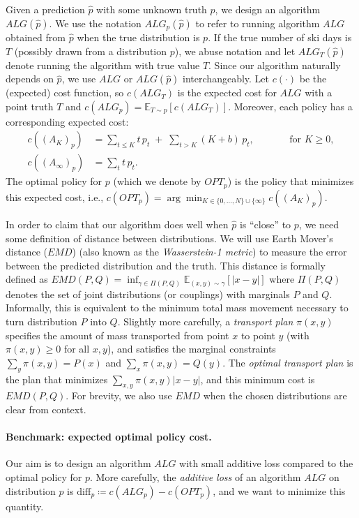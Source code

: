 Given a prediction $\hat{p}$ with some unknown truth $p$, we design an algorithm $ALG(\hat{p})$. We use the notation $ALG_p(\hat{p})$ to refer to running algorithm $ALG$ obtained from $\hat{p}$ when the true distribution is $p$. If the true number of ski days is $T$ (possibly drawn from a distribution $p$), we abuse notation and let $ALG_T(\hat p)$ denote running the algorithm with true value $T$.  Since our algorithm naturally depends on $\hat{p}$, we use $ALG$ or $ALG(\hat{p})$ interchangeably. Let $c(\cdot)$ be the (expected) cost function, so $c(ALG_T)$ is the expected cost for $ALG$ with a point truth $T$ and $c(ALG_p) = \mathbb{E}_{T \sim p}[c(ALG_T)]$. Moreover, each policy has a corresponding expected cost:
\begin{equation*} \label{eq:cost} 
\begin{aligned}
c((A_K)_p)
&= \sum_{t \le K} t\,p_t \;+\; \sum_{t > K} (K+b)\,p_t,
\qquad &&\text{for } K \ge 0, \\
c((A_\infty)_p)
&= \sum_{t} t\,p_t.
\end{aligned}
\end{equation*}
The optimal policy for $p$ (which we denote by $OPT_p$) is the policy that minimizes this expected cost, i.e., $c(OPT_p) = \arg \min_{K \in \{0, \dots, N\} \cup \{\infty\}} c((A_K)_p)$. 

In order to claim that our algorithm does well when $\hat p$ is ``close'' to $p$, we need some definition of distance between distributions.  We will use Earth Mover's distance ($EMD$) (also known as the \emph{Wasserstein-1 metric}) to measure the error between the predicted distribution and the truth. This distance is formally defined as $EMD(P, Q) = \inf_{\gamma \in \Pi(P, Q)} \mathbb{E}_{(x, y) \sim \gamma}[|x - y|]$ where $\Pi(P, Q)$ denotes the set of joint distributions (or couplings) with marginals $P$ and $Q$.  Informally, this is equivalent to the minimum total mass movement necessary to turn distribution $P$ into $Q$.  Slightly more carefully, a \emph{transport plan} $\pi(x, y)$ specifies the amount of mass transported from point $x$ to point $y$ (with $\pi(x,y) \geq 0$ for all $x,y$), and satisfies the marginal constraints
$\sum_y \pi(x, y) = P(x)$ and $ \sum_x \pi(x, y) = Q(y)$.  The \emph{optimal transport plan} is the plan that minimizes $\sum_{x,y} \pi(x,y) |x-y|$, and this minimum cost is $EMD(P,Q)$.   
For brevity, we also use $EMD$ when the chosen distributions are clear from context.


\paragraph{Benchmark: expected optimal policy cost.}  Our aim is to design an algorithm $ALG$ with small additive loss compared to the optimal policy for $p$.  More carefully, the \emph{additive loss} of an algorithm $ALG$ on distribution $p$ is $\text{diff}_p \coloneqq c(ALG_p) - c(OPT_p)$, and we want to minimize this quantity.

